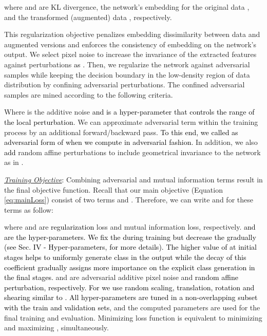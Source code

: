 \documentclass[letterpaper, 10 pt, journal, twoside]{IEEEtran}
\newcommand{\revised}{\textcolor{black}}{}
\begin{document}
\vspace*{-0.75em}

\vspace*{-1.0em}

where  and  are KL divergence, the network's embedding for the original data , and the transformed (augmented) data , respectively.\par
This regularization objective penalizes embedding dissimilarity between data and augmented versions and enforces the consistency of embedding on the network's output. We select pixel noise to increase the invariance of the extracted features against perturbations \revised{ as .} Then, we regularize the network against adversarial samples while keeping the decision boundary in the low-density region of data distribution by confining adversarial perturbations. The confined adversarial samples are mined according to the following criteria.

\vspace*{-0.75em}

\vspace*{-1.0em}

Where  is the additive noise \revised{and  is a hyper-parameter that controls the range of the local perturbation}. We can approximate adversarial term  within the training process by an additional forward/backward pass. \revised{To this end, we called  as adversarial form of  when we compute  in adversarial fashion.} In addition, we also \revised{add} random affine perturbations to include geometrical invariance to the network as in \cite{IMSAT}.

\underline{\emph{Training Objective}}: Combining adversarial and mutual information terms result in the final objective function. Recall that our main objective (Equation \ref{eq:mainLoss}) consist of two terms  and . Therefore, we can write  and  for these terms as follow:
\vspace*{-0.5em}


where \revised{} and  are \revised{regularization} loss and mutual information loss, respectively. \revised{ and  are the hyper-parameters. We fix the  during training but decrease the  gradually (see Sec. IV - Hyper-parameters, for more details). The higher value of  at initial stages helps to uniformly generate class in the output while the decay of this coefficient gradually assigns more importance on the explicit class generation in the final stages.}  and \revised{} are adversarial additive pixel noise and \revised{random affine perturbation, respectively. For  we use random scaling, translation, rotation and shearing similar to \cite{IMSAT}.} \revised{All hyper-parameters are tuned in a non-overlapping subset with the train and validation sets}, and the computed parameters are used for the final training and evaluation. Minimizing loss function  is equivalent to minimizing \revised{} and maximizing , simultaneously.\par
\end{document}
